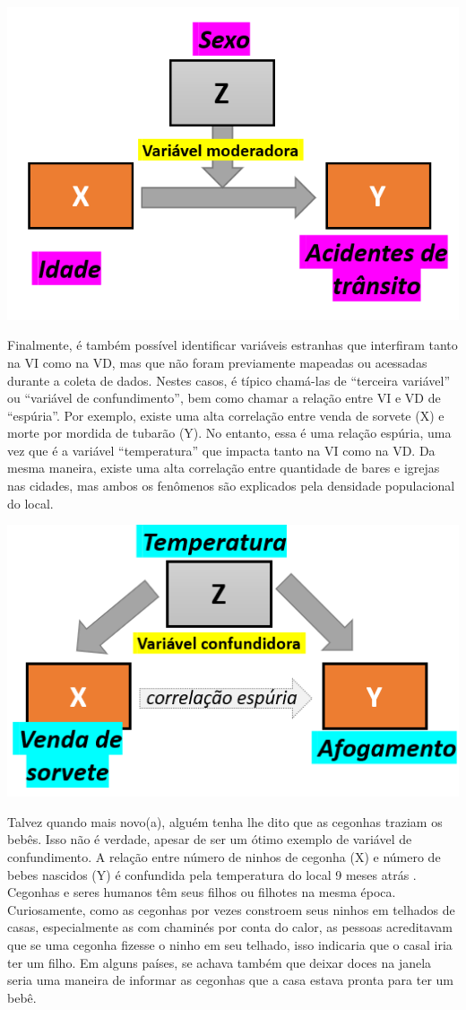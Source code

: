 \documentclass[
]{book}
\begin{document}
\includegraphics{./img/cap_moderacao.png}

Finalmente, é também possível identificar variáveis estranhas que interfiram tanto na VI como na VD, mas que não foram previamente mapeadas ou acessadas durante a coleta de dados. Nestes casos, é típico chamá-las de ``terceira variável'' ou ``variável de confundimento'', bem como chamar a relação entre VI e VD de ``espúria''. Por exemplo, existe uma alta correlação entre venda de sorvete (X) e morte por mordida de tubarão (Y). No entanto, essa é uma relação espúria, uma vez que é a variável ``temperatura'' que impacta tanto na VI como na VD. Da mesma maneira, existe uma alta correlação entre quantidade de bares e igrejas nas cidades, mas ambos os fenômenos são explicados pela densidade populacional do local.

\includegraphics{./img/cap_confundimento.png}

Talvez quando mais novo(a), alguém tenha lhe dito que as cegonhas traziam os bebês. Isso não é verdade, apesar de ser um ótimo exemplo de variável de confundimento. A relação entre número de ninhos de cegonha (X) e número de bebes nascidos (Y) é confundida pela temperatura do local 9 meses atrás \citep{Matthews2000}. Cegonhas e seres humanos têm seus filhos ou filhotes na mesma época. Curiosamente, como as cegonhas por vezes constroem seus ninhos em telhados de casas, especialmente as com chaminés por conta do calor, as pessoas acreditavam que se uma cegonha fizesse o ninho em seu telhado, isso indicaria que o casal iria ter um filho. Em alguns países, se achava também que deixar doces na janela seria uma maneira de informar as cegonhas que a casa estava pronta para ter um bebê.
\end{document}
